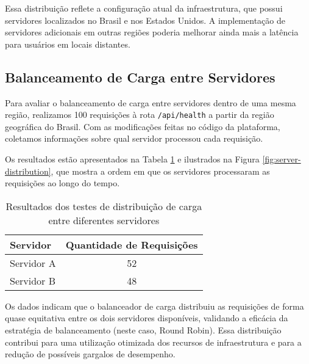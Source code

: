 Essa distribuição reflete a configuração atual da infraestrutura, que possui servidores localizados no Brasil e nos Estados Unidos. A implementação de servidores adicionais em outras regiões poderia melhorar ainda mais a latência para usuários em locais distantes.

\subsection{Balanceamento de Carga entre Servidores}

Para avaliar o balanceamento de carga entre servidores dentro de uma mesma região, realizamos 100 requisições à rota \texttt{/api/health} a partir da região geográfica do Brasil. Com as modificações feitas no código da plataforma, coletamos informações sobre qual servidor processou cada requisição.

Os resultados estão apresentados na Tabela \ref{tab:server-distribution} e ilustrados na Figura \ref{fig:server-distribution}, que mostra a ordem em que os servidores processaram as requisições ao longo do tempo.

\begin{table}[H]
    \centering
    \caption{Resultados dos testes de distribuição de carga entre diferentes servidores}
    \label{tab:server-distribution}
    \begin{tabular}{|l|c|}
        \hline
        \textbf{Servidor} & \textbf{Quantidade de Requisições} \\ \hline
        Servidor A            & 52                                 \\ \hline
        Servidor B    & 48                                 \\ \hline
    \end{tabular}
\end{table}


Os dados indicam que o balanceador de carga distribuiu as requisições de forma quase equitativa entre os dois servidores disponíveis, validando a eficácia da estratégia de balanceamento (neste caso, Round Robin). Essa distribuição contribui para uma utilização otimizada dos recursos de infraestrutura e para a redução de possíveis gargalos de desempenho.

